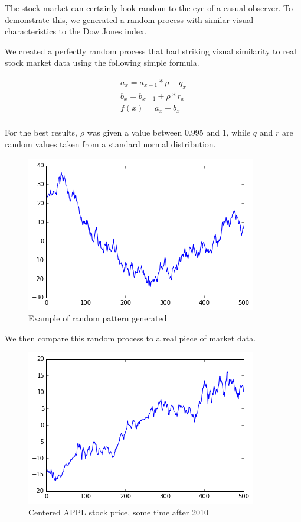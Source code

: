 \documentclass{report}
\begin{document}
The stock market can certainly look random to the eye of a casual observer. To demonstrate this, we generated a random process with similar visual characteristics to the Dow Jones index.

We created a perfectly random process that had striking visual similarity to real stock market data using the following simple formula.

\begin{align*}
	a_{x} = a_{x-1} * \rho + q_{x}\\
	b_{x} = b_{x-1} + \rho * r_{x}\\
	f(x) = a_{x} + b_{x}\\
\end{align*}

For the best results, $\rho$ was given a value between 0.995 and 1, while $q$ and $r$ are random values taken from a standard normal distribution. 

\begin{figure}[H]
	\caption{Example of random pattern generated}
	\centerline{\includegraphics[width=\textwidth]{vis/random-process.png}}
	\label{fig:random-process}
\end{figure}

We then compare this random process to a real piece of market data.

\begin{figure}[H]
	\caption{Centered APPL stock price, some time after 2010}
	\centerline{\includegraphics[width=\textwidth]{vis/appl.png}}
	\label{fig:appl-process}
\end{figure}
\end{document}
